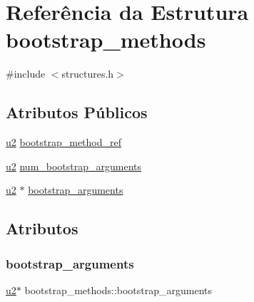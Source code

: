 \hypertarget{structbootstrap__methods}{}\section{Referência da Estrutura bootstrap\+\_\+methods}
\label{structbootstrap__methods}


{\ttfamily \#include $<$structures.\+h$>$}

\subsection*{Atributos Públicos}
\begin{DoxyCompactItemize}
\item 
\hyperlink{lista__operandos_8h_a732cde1300aafb73b0ea6c2558a7a54f}{u2} \hyperlink{structbootstrap__methods_a480411f5ca41d770aa9ce24ee7e8e1e8}{bootstrap\+\_\+method\+\_\+ref}
\item 
\hyperlink{lista__operandos_8h_a732cde1300aafb73b0ea6c2558a7a54f}{u2} \hyperlink{structbootstrap__methods_aad28739e25a094400551fd1080fdb1f6}{num\+\_\+bootstrap\+\_\+arguments}
\item 
\hyperlink{lista__operandos_8h_a732cde1300aafb73b0ea6c2558a7a54f}{u2} $\ast$ \hyperlink{structbootstrap__methods_a2204bb6639e44938bda3b11fbb32dd10}{bootstrap\+\_\+arguments}
\end{DoxyCompactItemize}


\subsection{Atributos}
\mbox{\label{structbootstrap__methods_a2204bb6639e44938bda3b11fbb32dd10}} 
\subsubsection{\texorpdfstring{bootstrap\+\_\+arguments}{bootstrap\_arguments}}
{\footnotesize\ttfamily \hyperlink{lista__operandos_8h_a732cde1300aafb73b0ea6c2558a7a54f}{u2}$\ast$ bootstrap\+\_\+methods\+::bootstrap\+\_\+arguments}

\mbox{\label{structbootstrap__methods_a480411f5ca41d770aa9ce24ee7e8e1e8}} 
